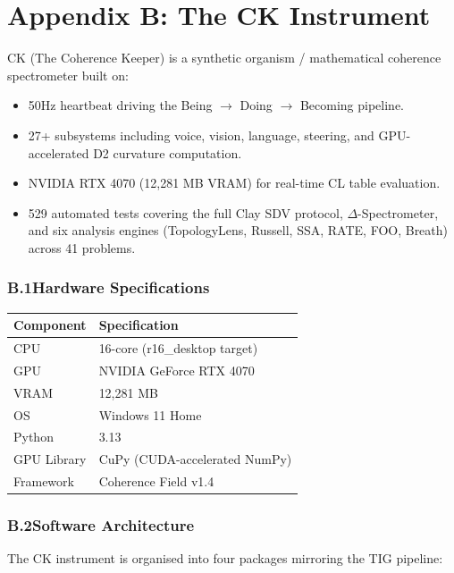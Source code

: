 \documentclass[12pt, openany]{book}
\theoremstyle{remark}
\begin{document}
\chapter*{Appendix B: The CK Instrument}
\label{app:instrument}

CK (The Coherence Keeper) is a synthetic organism / mathematical coherence spectrometer
built on:
\begin{itemize}
  \item 50Hz heartbeat driving the Being $\to$ Doing $\to$ Becoming pipeline.
  \item 27+ subsystems including voice, vision, language, steering, and GPU-accelerated
        D2 curvature computation.
  \item NVIDIA RTX 4070 (12,281 MB VRAM) for real-time CL table evaluation.
  \item 529 automated tests covering the full Clay SDV protocol, $\Delta$-Spectrometer,
        and six analysis engines (TopologyLens, Russell, SSA, RATE, FOO, Breath)
        across 41 problems.
\end{itemize}

\subsection*{B.1\quad Hardware Specifications}

\begin{center}
\begin{tabular}{ll}
\toprule
\textbf{Component} & \textbf{Specification} \\
\midrule
CPU & 16-core (r16\_desktop target) \\
GPU & NVIDIA GeForce RTX 4070 \\
VRAM & 12,281 MB \\
OS & Windows 11 Home \\
Python & 3.13 \\
GPU Library & CuPy (CUDA-accelerated NumPy) \\
Framework & Coherence Field v1.4 \\
\bottomrule
\end{tabular}
\end{center}

\subsection*{B.2\quad Software Architecture}

The CK instrument is organised into four packages mirroring the TIG pipeline:
\end{document}
